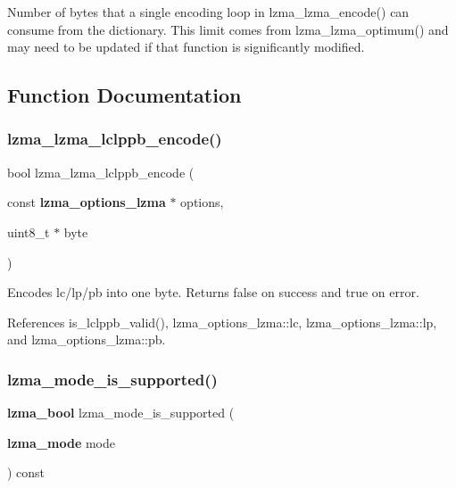 Number of bytes that a single encoding loop in lzma\+\_\+lzma\+\_\+encode() can consume from the dictionary. This limit comes from lzma\+\_\+lzma\+\_\+optimum() and may need to be updated if that function is significantly modified. 

\subsection{Function Documentation}
\mbox{\label{lzma__encoder_8c_a24e42d27f537c4382fe298c9909b1a52}} 
\subsubsection{lzma\+\_\+lzma\+\_\+lclppb\+\_\+encode()}
{\footnotesize\ttfamily bool lzma\+\_\+lzma\+\_\+lclppb\+\_\+encode (\begin{DoxyParamCaption}\item[{const \textbf{ lzma\+\_\+options\+\_\+lzma} $\ast$}]{options,  }\item[{uint8\+\_\+t $\ast$}]{byte }\end{DoxyParamCaption})}



Encodes lc/lp/pb into one byte. Returns false on success and true on error. 



References is\+\_\+lclppb\+\_\+valid(), lzma\+\_\+options\+\_\+lzma\+::lc, lzma\+\_\+options\+\_\+lzma\+::lp, and lzma\+\_\+options\+\_\+lzma\+::pb.

\mbox{\label{lzma__encoder_8c_ac1ec0561a8ed9889cb8c049d484c2c5c}} 
\subsubsection{lzma\+\_\+mode\+\_\+is\+\_\+supported()}
{\footnotesize\ttfamily \textbf{ lzma\+\_\+bool} lzma\+\_\+mode\+\_\+is\+\_\+supported (\begin{DoxyParamCaption}\item[{\textbf{ lzma\+\_\+mode}}]{mode }\end{DoxyParamCaption}) const}



